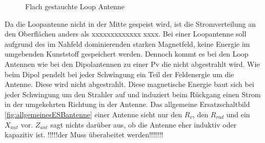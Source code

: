 \begin{figure}[!ht]
	\begin{center}
	\end{center}
\caption{Flach gestauchte Loop Antenne}
\label{fig:FflacheLoopAntenne}
\end{figure}

Da  die Loopantenne nicht in der Mitte gespeist wird, ist die Stromverteilung an den Oberflächen anders als xxxxxxxxxxxxx xxxx. Bei einer Loopantenne soll aufgrund des im Nahfeld dominierenden starken Magnetfeld, keine Energie im umgebenden Kunststoff gespeichert werden. Dennoch kommt es bei den Loop Antennen wie bei den Dipolantennen zu einer Pv die nicht abgestrahlt wird. Wie beim Dipol pendelt bei jeder Schwingung ein Teil der Feldenergie um die Antenne. Diese wird nicht abgestrahlt. Diese magnetische Energie baut sich bei jeder Schwingung um den Strahler auf und induziert beim Rückgang einen Strom in der umgekehrten Richtung in der Antenne. Das allgemeine Ersatzschaltbild \ref{fig:allgemeinesESBantenne} einer Antenne sieht nur den $R_{v}$, den $R_{rad}$ und ein $X_{ant}$ vor. $Z_{ant}$ sagt nichts darüber aus, ob die Antenne eher induktiv oder kapazitiv ist.
!!!!!der Muss überabeitet werden!!!!!!!


